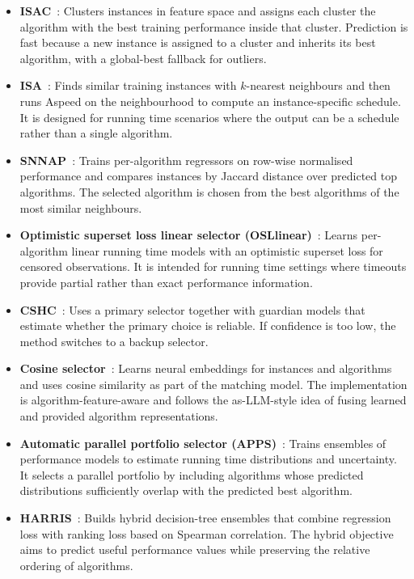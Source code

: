 \begin{itemize}
    \item \textbf{ISAC}~\citep{KadEtAl10}: Clusters instances in feature space and assigns each cluster the algorithm with the best training performance inside that cluster. Prediction is fast because a new instance is assigned to a cluster and inherits its best algorithm, with a global-best fallback for outliers.
    \item \textbf{ISA}~\citep{LinEtAl16}: Finds similar training instances with $k$-nearest neighbours and then runs Aspeed on the neighbourhood to compute an instance-specific schedule. It is designed for running time scenarios where the output can be a schedule rather than a single algorithm.
    \item \textbf{SNNAP}~\citep{ColEtAl13}: Trains per-algorithm regressors on row-wise normalised performance and compares instances by Jaccard distance over predicted top algorithms. The selected algorithm is chosen from the best algorithms of the most similar neighbours.
    \item \textbf{Optimistic superset loss linear selector (OSLlinear)}~\citep{HanEtAl21b}: Learns per-algorithm linear running time models with an optimistic superset loss for censored observations. It is intended for running time settings where timeouts provide partial rather than exact performance information.
    \item \textbf{CSHC}~\citep{MalEtAl13}: Uses a primary selector together with guardian models that estimate whether the primary choice is reliable. If confidence is too low, the method switches to a backup selector.
    \item \textbf{Cosine selector}~\citep{WuEtAl24}: Learns neural embeddings for instances and algorithms and uses cosine similarity as part of the matching model. The implementation is algorithm-feature-aware and follows the \gls{as}-LLM-style idea of fusing learned and provided algorithm representations.
    \item \textbf{Automatic parallel portfolio selector (APPS)}~\citep{KasEtAl23}: Trains ensembles of performance models to estimate running time distributions and uncertainty. It selects a parallel portfolio by including algorithms whose predicted distributions sufficiently overlap with the predicted best algorithm.
    \item \textbf{HARRIS}~\citep{FehEtAl22}: Builds hybrid decision-tree ensembles that combine regression loss with ranking loss based on Spearman correlation. The hybrid objective aims to predict useful performance values while preserving the relative ordering of algorithms.

\end{itemize}
